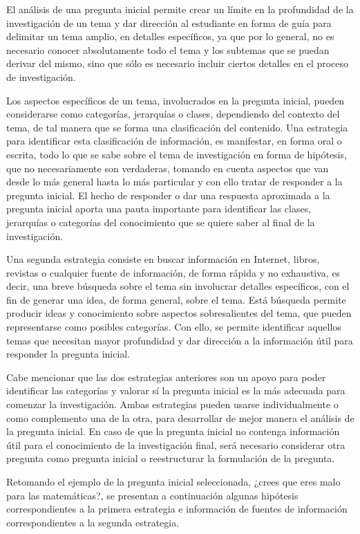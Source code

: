 El análisis de una pregunta inicial permite crear un límite en la profundidad de la investigación de un tema y dar dirección al estudiante en forma de guía para delimitar un tema amplio, en detalles específicos, ya que por lo general, no es necesario conocer absolutamente todo el tema y los subtemas que se puedan derivar del mismo, sino que sólo es necesario incluir ciertos detalles en el proceso de investigación.

Los aspectos específicos de un tema, involucrados en la pregunta inicial, pueden considerarse como categorías, jerarquías o clases, dependiendo del contexto del tema, de tal manera que se forma una clasificación del contenido. Una estrategia para identificar esta clasificación de información, es manifestar, en forma oral o escrita, todo lo que se sabe sobre el tema de investigación en forma de hipótesis, que no necesariamente son verdaderas, tomando en cuenta aspectos que van desde lo más general hasta lo más particular y con ello tratar de responder a la pregunta inicial. El hecho de responder o dar una respuesta aproximada a la pregunta inicial aporta una pauta importante para identificar las clases, jerarquías o categorías del conocimiento que se quiere saber al final de la investigación.

Una segunda estrategia consiste en buscar información en Internet, libros, revistas o cualquier fuente de información, de forma rápida y no exhaustiva, es decir, una breve búsqueda sobre el tema sin involucrar detalles específicos, con el fin de generar una idea, de forma general, sobre el tema. Está búsqueda permite producir ideas y conocimiento sobre aspectos sobresalientes del tema, que pueden representarse como posibles categorías. Con ello, se permite identificar aquellos temas que necesitan mayor profundidad y dar dirección a la información útil para responder la pregunta inicial.

Cabe mencionar que las dos estrategias anteriores son un apoyo para poder identificar las categorías y valorar sí la pregunta inicial es la más adecuada para comenzar la investigación. Ambas estrategias pueden usarse individualmente o como complemento una de la otra, para desarrollar de mejor manera el análisis de la pregunta inicial. En caso de que la pregunta inicial no contenga información útil para el conocimiento de la investigación final, será necesario considerar otra pregunta como pregunta inicial o reestructurar la formulación de la pregunta.

Retomando el ejemplo de la pregunta inicial seleccionada, ¿crees que eres malo para las matemáticas?, se presentan a continuación algunas hipótesis correspondientes a la primera estrategia e información de fuentes de información correspondientes a la segunda estrategia.

